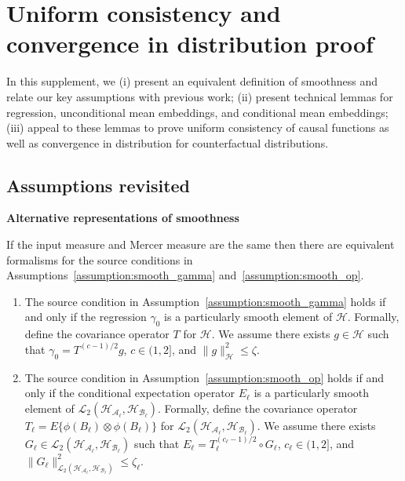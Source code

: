 \section{Uniform consistency and convergence in distribution proof}\label{sec:proof}

In this supplement, we (i) present an equivalent definition of smoothness and relate our key assumptions with previous work; (ii) present technical lemmas for regression, unconditional mean embeddings, and conditional mean embeddings; (iii) appeal to these lemmas to prove uniform consistency of causal functions as well as convergence in distribution for counterfactual distributions.

\subsection{Assumptions revisited}

\textbf{Alternative representations of smoothness}

\begin{lemma}\label{lemma:alt}
If the input measure and Mercer measure are the same then there are equivalent formalisms for the source conditions in Assumptions~\ref{assumption:smooth_gamma} and~\ref{assumption:smooth_op}.
\begin{enumerate}
    \item The source condition in Assumption~\ref{assumption:smooth_gamma} holds if and only if the regression $\gamma_0$ is a particularly smooth element of $\mathcal{H}$. Formally, define the covariance operator $T$ for $\mathcal{H}$.
    We assume there exists $ g\in \mathcal{H}$ such that $\gamma_0=T^{(c-1)/2}g$, $c\in(1,2]$, and $\|g\|^2_{\mathcal{H}}\leq\zeta$.
    \item The source condition in Assumption~\ref{assumption:smooth_op} holds if and only if the conditional expectation operator $E_{\ell}$ is a particularly smooth element of $\mathcal{L}_2(\mathcal{H}_{\mathcal{A}_{\ell}},\mathcal{H}_{\mathcal{B}_{\ell}})$. Formally, define the covariance operator $T_{\ell}=E\{\phi(B_{\ell})\otimes \phi(B_{\ell})\}$ for $\mathcal{L}_2(\mathcal{H}_{\mathcal{A}_{\ell}},\mathcal{H}_{\mathcal{B}_{\ell}})$.
    We assume there exists $ G_{\ell}\in \mathcal{L}_2(\mathcal{H}_{\mathcal{A}_{\ell}},\mathcal{H}_{\mathcal{B}_{\ell}})$ such that $E_{\ell}=T_{\ell}^{(c_{\ell}-1)/2}\circ G_{\ell}$, $c_{\ell}\in(1,2]$, and $\|G_{\ell}\|^2_{\mathcal{L}_2(\mathcal{H}_{\mathcal{A}_{\ell}},\mathcal{H}_{\mathcal{B}_{\ell}})}\leq\zeta_{\ell}$.
\end{enumerate}
\end{lemma}

